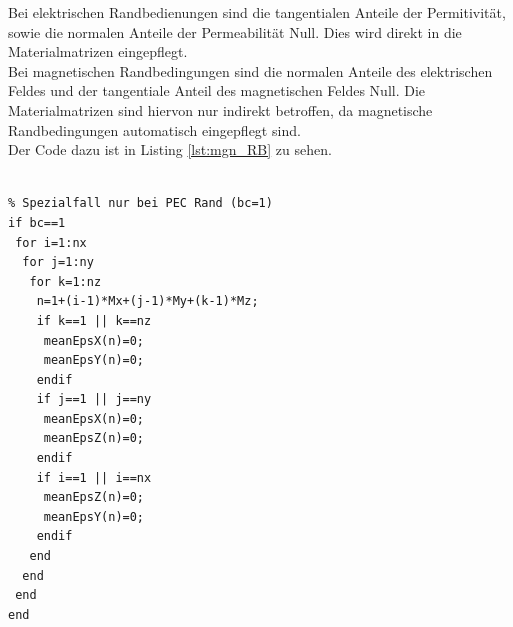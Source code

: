 \documentclass[Protokollheft.tex]{subfiles}
\begin{document}
\noindent
Bei elektrischen Randbedienungen sind die tangentialen Anteile der Permitivität, sowie die normalen Anteile der Permeabilität Null. Dies wird direkt in die Materialmatrizen eingepflegt.\\
Bei magnetischen Randbedingungen sind die normalen Anteile des elektrischen Feldes und der tangentiale Anteil des magnetischen Feldes Null. 
Die Materialmatrizen sind hiervon nur indirekt betroffen, da magnetische Randbedingungen automatisch eingepflegt sind. \\
Der Code dazu ist in Listing \ref{lst:mgn_RB} zu sehen.
\begin{lstlisting}[caption={Einsetzen der elektrischen Randbedigungen},label={lst:mgn_RB}]
%% Randbedingungen

% Spezialfall nur bei PEC Rand (bc=1)
if bc==1
 for i=1:nx
  for j=1:ny
   for k=1:nz
    n=1+(i-1)*Mx+(j-1)*My+(k-1)*Mz;
    if k==1 || k==nz
     meanEpsX(n)=0; 
     meanEpsY(n)=0;
    endif
    if j==1 || j==ny
     meanEpsX(n)=0; 
     meanEpsZ(n)=0;
    endif
    if i==1 || i==nx
     meanEpsZ(n)=0; 
     meanEpsY(n)=0;
    endif
   end
  end
 end
end
\end{lstlisting}
\end{document}
